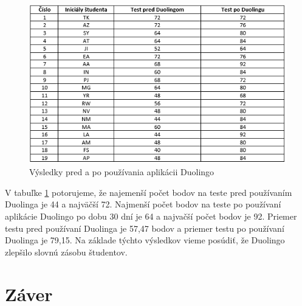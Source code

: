 \documentclass[10pt,oneside,slovak,a4paper]{article}
\begin{document}
\begin{figure}[h] %
\centering
\includegraphics{duo_studium.png}
\caption{Výsledky pred a po používania aplikácii Duolingo\cite{duolingo}}
\label{duo-studium}
\end{figure}

V tabuľke \ref{duo-studium} potorujeme, že najemenší počet bodov na teste pred používaním Duolinga je 44 a najväčší 72. Najmenší počet bodov na teste po používaní aplikácie  Duolingo po dobu 30 dní je 64 a najvačší počet bodov je 92. Priemer testu pred používaní Duolinga je 57,47 bodov a priemer testu po používaní Duolinga je 79,15. \cite{duolingo} Na základe týchto výsledkov vieme posúdiť, že Duolingo zlepšilo slovnú zásobu študentov.

\section{Záver}



\end{document}

